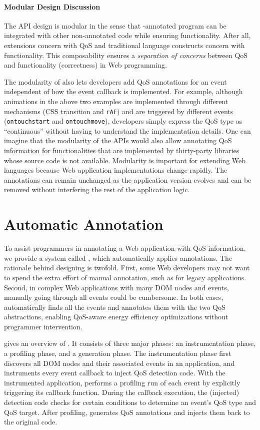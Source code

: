 \paragraph{Modular Design Discussion} The \greenweb API design is modular in the sense that \greenweb-annotated program can be integrated with other non-annotated code while ensuring functionality. After all, \greenweb extensions concern with QoS and traditional language constructs concern with functionality. This composability ensures a \textit{separation of concerns} between QoS and functionality (correctness) in Web programming.

The modularity of \greenweb also lets developers add QoS annotations for an event independent of how the event callback is implemented. For example, although animations in the above two examples are implemented through different mechanisms (CSS transition and \texttt{rAF}) and are triggered by different events (\texttt{ontouchstart} and \texttt{ontouchmove}), developers simply express the QoS type as ``continuous'' without having to understand the implementation details. One can imagine that the modularity of the \greenweb APIs would also allow annotating QoS information for functionalities that are implemented by thirty-party libraries whose source code is not available. Modularity is important for extending Web languages because Web application implementations change rapidly. The \greenweb annotations can remain unchanged as the application version evolves and can be removed without interfering the rest of the application logic.

\section{Automatic Annotation}
\label{sec:lang:auto}

To assist programmers in annotating a Web application with QoS information, we provide a system called \autogreen, which automatically applies \greenweb annotations. The rationale behind designing \autogreen is twofold. First, some Web developers may not want to spend the extra effort of manual annotation, such as for legacy applications. Second, in complex Web applications with many DOM nodes and events, manually going through all events could be cumbersome. In both cases, \autogreen automatically finds all the events and annotates them with the two QoS abstractions, enabling QoS-aware energy efficiency optimizations without programmer intervention.

 gives an overview of \autogreen. It consists of three major phases: an instrumentation phase, a profiling phase, and a generation phase. The instrumentation phase first discovers all DOM nodes and their associated events in an application, and instruments every event callback to inject QoS detection code. With the instrumented application, \autogreen performs a profiling run of each event by explicitly triggering its callback function. During the callback execution, the (injected) detection code checks for certain conditions to determine an event's QoS type and QoS target. After profiling, \autogreen generates QoS annotations and injects them back to the original code.

